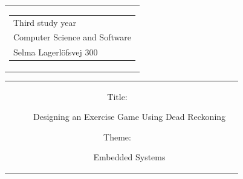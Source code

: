 

\thispagestyle{empty}
\begin{titlingpage}
 \begin{nopagebreak}
 {\samepage 
 \begin{tabular}{r}
\parbox{\textwidth}{  
 \hfill \parbox{4.9cm}{\begin{tabular}{l}
{\textsf\small \textsf{Third study year }}\\
{\textsf\small \textsf{Computer Science and Software}} \\
{\textsf\small \textsf{Selma Lagerlöfsvej 300}} \\
 \end{tabular}}
}
\end{tabular}

 \begin{tabular}{cc}
\parbox{7cm}{
\begin{description}

\item[Title:]

Designing an Exercise Game Using Dead Reckoning
  
 \item[Theme:]

Embedded Systems

 \end{description}

\parbox{8cm}{

}}
\end{tabular}}
\end{nopagebreak}
\end{titlingpage}
